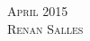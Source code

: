 \documentclass[landscape,a4paper]{article}
\begin{document}
\pagestyle{empty} %

\noindent



\begin{center}
\textsc{\LARGE April 2015}\\ %
\textsc{\large Renan Salles} %
\end{center}

\end{document}
